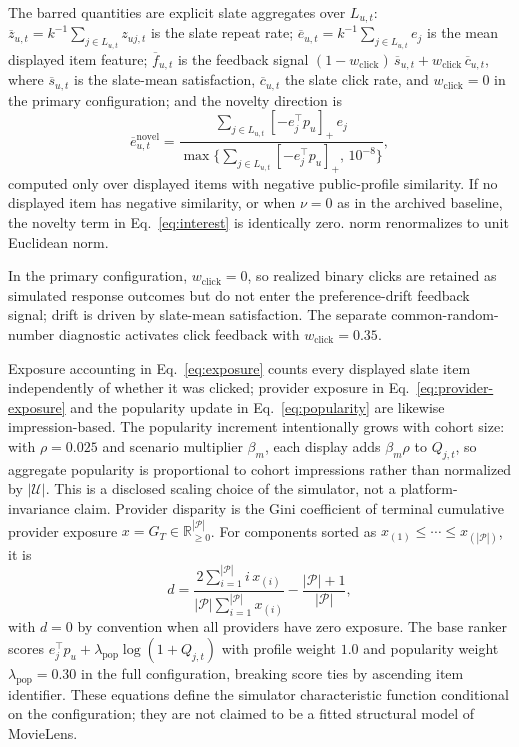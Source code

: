 \documentclass[review]{elsarticle}
\theoremstyle{plain}
\theoremstyle{definition}
\theoremstyle{remark}
\begin{document}
\begin{appendices}
The barred quantities are explicit slate aggregates over $L_{u,t}$: $\overline z_{u,t}=k^{-1}\sum_{j\in L_{u,t}}z_{uj,t}$ is the slate repeat rate; $\overline e_{u,t}=k^{-1}\sum_{j\in L_{u,t}}e_j$ is the mean displayed item feature; $\overline f_{u,t}$ is the feedback signal $(1-w_{\mathrm{click}})\,\overline s_{u,t}+w_{\mathrm{click}}\,\overline c_{u,t}$, where $\overline s_{u,t}$ is the slate-mean satisfaction, $\overline c_{u,t}$ the slate click rate, and $w_{\mathrm{click}}=0$ in the primary configuration; and the novelty direction is
\begin{equation}
 \overline e^{\mathrm{novel}}_{u,t}=\frac{\sum_{j\in L_{u,t}}[-e_j^\top p_u]_+\,e_j}{\max\{\sum_{j\in L_{u,t}}[-e_j^\top p_u]_+,\,10^{-8}\}},
\end{equation}
computed only over displayed items with negative public-profile similarity. If no displayed item has negative similarity, or when $\nu=0$ as in the archived baseline, the novelty term in Eq.~\eqref{eq:interest} is identically zero. $\mathrm{norm}$ renormalizes to unit Euclidean norm.

In the primary configuration, $w_{\mathrm{click}}=0$, so realized binary clicks are retained as simulated response outcomes but do not enter the preference-drift feedback signal; drift is driven by slate-mean satisfaction. The separate common-random-number diagnostic activates click feedback with $w_{\mathrm{click}}=0.35$.

Exposure accounting in Eq.~\eqref{eq:exposure} counts every displayed slate item independently of whether it was clicked; provider exposure in Eq.~\eqref{eq:provider-exposure} and the popularity update in Eq.~\eqref{eq:popularity} are likewise impression-based. The popularity increment intentionally grows with cohort size: with $\rho=0.025$ and scenario multiplier $\beta_m$, each display adds $\beta_m\rho$ to $Q_{j,t}$, so aggregate popularity is proportional to cohort impressions rather than normalized by $|\mathcal{U}|$. This is a disclosed scaling choice of the simulator, not a platform-invariance claim. Provider disparity is the Gini coefficient of terminal cumulative provider exposure $x=G_T\in\mathbb{R}_{\geq0}^{|\mathcal{P}|}$. For components sorted as $x_{(1)}\leq\cdots\leq x_{(|\mathcal{P}|)}$, it is
\begin{equation}
 d=\frac{2\sum_{i=1}^{|\mathcal{P}|}i\,x_{(i)}}{|\mathcal{P}|\sum_{i=1}^{|\mathcal{P}|}x_{(i)}}-\frac{|\mathcal{P}|+1}{|\mathcal{P}|},
\label{eq:gini}
\end{equation}
with $d=0$ by convention when all providers have zero exposure. The base ranker scores $e_j^\top p_u+\lambda_{\mathrm{pop}}\log(1+Q_{j,t})$ with profile weight $1.0$ and popularity weight $\lambda_{\mathrm{pop}}=0.30$ in the full configuration, breaking score ties by ascending item identifier. These equations define the simulator characteristic function conditional on the configuration; they are not claimed to be a fitted structural model of MovieLens.


\end{appendices}
\end{document}

